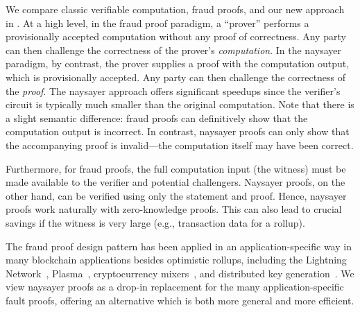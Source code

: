 We compare classic verifiable computation, fraud proofs, and our new approach in . 
At a high level, in the fraud proof paradigm, a ``prover'' performs a provisionally accepted computation without any proof of correctness. Any party can then challenge the correctness of the prover's \emph{computation}. %
In the naysayer paradigm, by contrast, the prover supplies a proof with the computation output, which is provisionally accepted. Any party can then challenge the correctness of the \emph{proof}. %
The naysayer approach offers significant speedups since the verifier's circuit is typically much smaller than the original computation. 
Note that there is a slight semantic difference: fraud proofs can definitively show that the computation output is incorrect. In contrast, naysayer proofs can only show that the accompanying proof is invalid---the computation itself may have been correct.

Furthermore, for fraud proofs, the full computation input (the witness) must be made available to the verifier and potential challengers. %
Naysayer proofs, on the other hand, 
can be verified using only the statement and proof. 
Hence, naysayer proofs work naturally with zero-knowledge proofs.
This can also lead to crucial savings if the witness is very large %
(e.g., transaction data for a rollup).

The fraud proof design pattern has been applied in an application-specific way in many blockchain applications besides optimistic rollups, including the Lightning Network~\cite{PooDry16}, Plasma~\cite{PooBut17}, cryptocurrency mixers~\cite{EPRINT:SNBB19}, and distributed key generation~\cite{EPRINT:SJSW19}. We view naysayer proofs as a drop-in replacement for the many application-specific fault proofs, offering an alternative which is both more general and more efficient.

